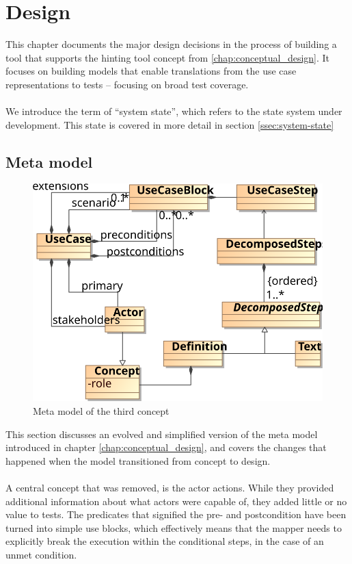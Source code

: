 \chapter{Design}
This chapter documents the major design decisions in the process of building a tool that supports the hinting tool concept from \ref{chap:conceptual_design}. It focuses on building models that enable translations from the use case representations to tests -- focusing on broad test coverage.\\\\
We introduce the term of ``system state'', which refers to the state system under development. This state is covered in more detail in section \ref{ssec:system-state}

\section{Meta model}
\begin{figure}[!htbp]
  \centering
  \includegraphics[scale=0.9]{img/3rd_iteration_meta_model}
  \caption{Meta model of the third concept}
  \label{fig:3rd_iteration_meta_model}
\end{figure}
\noindent This section discusses an evolved and simplified version of the meta model introduced in chapter \ref{chap:conceptual_design}, and covers the changes that happened when the model transitioned from concept to design.\\\\
A central concept that was removed, is the actor actions. While they provided additional information about what actors were capable of, they added little or no value to tests. The predicates that signified the pre- and postcondition have been turned into simple use blocks, which effectively means that the mapper needs to explicitly break the execution within the conditional steps, in the case of an unmet condition.\\\\
